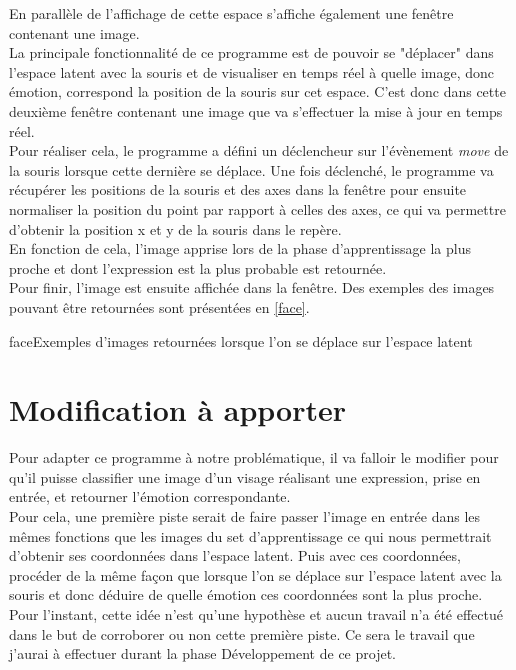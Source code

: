 \documentclass[poster]{polytech/polytech}
\begin{document}
En parallèle de l'affichage de cette espace s'affiche également une fenêtre contenant une image.\\
La principale fonctionnalité de ce programme est de pouvoir se "déplacer" dans l'espace latent avec la souris et de visualiser en temps réel à quelle image, donc émotion, correspond la position de la souris sur cet espace. C'est donc dans cette deuxième fenêtre contenant une image que va s'effectuer la mise à jour en temps réel.\\
Pour réaliser cela, le programme a défini un déclencheur sur l'évènement \textit{move} de la souris lorsque cette dernière se déplace. Une fois déclenché, le programme va récupérer les positions de la souris et des axes dans la fenêtre pour ensuite normaliser la position du point par rapport à celles des axes, ce qui va permettre d'obtenir la position x et y de la souris dans le repère.\\
En fonction de cela, l'image apprise lors de la phase d'apprentissage la plus proche et dont l'expression est la plus probable est retournée.\\
Pour finir, l'image est ensuite affichée dans la fenêtre. Des exemples des images pouvant être retournées sont présentées en \autoref{face}.
\begin{Figure}{face}{Exemples d'images retournées lorsque l'on se déplace sur l'espace latent}
\end{Figure}

\section{Modification à apporter}
Pour adapter ce programme à notre problématique, il va falloir le modifier pour qu'il puisse classifier une image d'un visage réalisant une expression, prise en entrée, et retourner l'émotion correspondante.\\
Pour cela, une première piste serait de faire passer l'image en entrée dans les mêmes fonctions que les images du set d'apprentissage ce qui nous permettrait d'obtenir ses coordonnées dans l'espace latent. Puis avec ces coordonnées, procéder de la même façon que lorsque l'on se déplace sur l'espace latent avec la souris et donc déduire de quelle émotion ces coordonnées sont la plus proche.\\
Pour l'instant, cette idée n'est qu'une hypothèse et aucun travail n'a été effectué dans le but de corroborer ou non cette première piste. Ce sera le travail que j'aurai à effectuer durant la phase Développement de ce projet.
\end{document}
